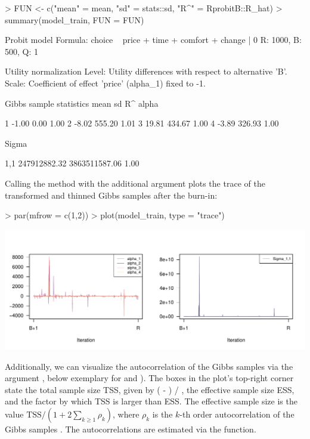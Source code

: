 \documentclass[article,shortnames]{jss}
\newcommand{\fct}[1]{\code{#1()}}
\begin{document}
\begin{Schunk}
\begin{Sinput}
> FUN <- c("mean" = mean, "sd" = stats::sd, "R^" = RprobitB::R_hat)
> summary(model_train, FUN = FUN)
\end{Sinput}
\begin{Soutput}
Probit model
Formula: choice ~ price + time + comfort + change | 0
R: 1000, B: 500, Q: 1

Utility normalization
Level: Utility differences with respect to alternative 'B'.
Scale: Coefficient of effect 'price' (alpha_1) fixed to -1.

Gibbs sample statistics
          mean      sd      R^
 alpha

     1   -1.00    0.00    1.00
     2   -8.02  555.20    1.01
     3   19.81  434.67    1.00
     4   -3.89  326.93    1.00

 Sigma

   1,1 247912882.32 3863511587.06    1.00
\end{Soutput}
\end{Schunk}

Calling the \fct{plot} method with the additional argument  plots the trace of the transformed and thinned Gibbs samples after the burn-in:

\begin{Schunk}
\begin{Sinput}
> par(mfrow = c(1,2))
> plot(model_train, type = "trace")
\end{Sinput}
\end{Schunk}
\includegraphics{rprobitb_oelschlaeger_bauer-model-train-trace}

Additionally, we can visualize the autocorrelation of the Gibbs samples via the argument , below exemplary for  and ). The boxes in the plot's top-right corner state the total sample size TSS, given by ( - ) / , the effective sample size ESS, and the factor by which TSS is larger than ESS. The effective sample size is the value $\text{TSS} / (1 + 2\sum_{k\geq 1} \rho_k)$, where $\rho_k$ is the $k$-th order autocorrelation of the Gibbs samples \citep{Marin:2014}. The autocorrelations are estimated via the \fct{stats::acf} function.
\end{document}
